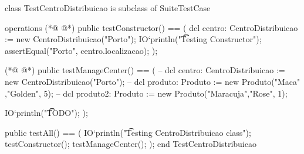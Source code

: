 \begin{vdmpp}[breaklines=true]
class TestCentroDistribuicao is subclass of SuiteTestCase

operations
(*@
\label{testConstructor:4}
@*)
  public testConstructor() == (
    dcl centro: CentroDistribuicao := new CentroDistribuicao("Porto");
    IO`println("\t\t Testing Constructor");
    assertEqual("Porto", centro.localizacao);
  );
 
(*@
\label{testManageCenter:10}
@*)
 public testManageCenter()  == (
 --  dcl centro: CentroDistribuicao := new CentroDistribuicao("Porto");
 --  dcl produto: Produto := new Produto("Maca" ,"Golden", 5);
 --  dcl produto2: Produto := new Produto("Maracuja","Rose", 1);
   
   IO`println("\t\t TODO");  
);
 
  public testAll() == (
    IO`println("\t Testing CentroDistribuicao class");
    testConstructor();
    testManageCenter();
  );
end TestCentroDistribuicao
\end{vdmpp}
